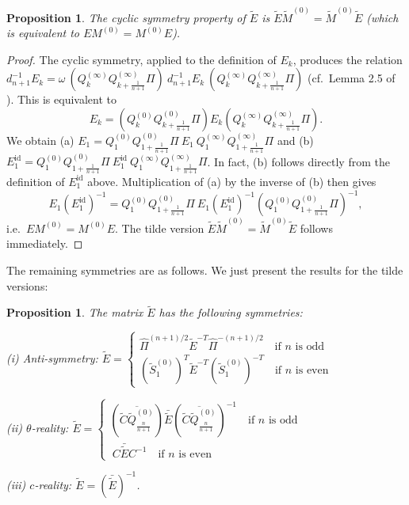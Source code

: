 \documentclass[a4paper,12pt,leqno]{amsart}
\numberwithin{equation}{section}
\theoremstyle{plain}
\newtheorem{proposition}[theorem]{Proposition}
\theoremstyle{definition}
\newcommand{\om}{\omega}
\DeclareMathOperator{\id}{id}
\newcommand{\Qz}{  Q^{(0)}  }
\newcommand{\Qi}{  Q^{(\infty)}  }
\newcommand{\Mz}{ M^{(0)}  }
\newcommand{\tSz}{  \tilde S^{(0)}  }
\newcommand{\tQz}{  \tilde Q^{(0)}  }
\newcommand{\tE}{  \tilde E  }
\newcommand{\tMz}{  \tilde M^{(0)}  }
\begin{document}
\begin{proposition}\label{Ecyclic} The cyclic symmetry property of $\tE$ is $\tE\tMz=\tMz \tE$
(which is equivalent to $E\Mz=\Mz E$).
\end{proposition}

\begin{proof} The cyclic symmetry, applied to the definition of $E_k$, produces the relation
$d_{n+1}^{-1} E_k= \om \ (\Qi_k \Qi_{k+\frac1{n+1}} \Pi)
\
d_{n+1}^{-1} E_k\  (\Qi_k \Qi_{k+\frac1{n+1}} \Pi)$
(cf.\ Lemma 2.5 of \cite{GIL2}).  This is equivalent to
\[
E_k = (\Qz_k \Qz_{k+\frac1{n+1}} \Pi) E_k (\Qi_k \Qi_{k+\frac1{n+1}} \Pi).
\]
We obtain
(a) $E_1 = \Qz_1\Qz_{1+\scriptstyle\frac1{n+1}}\Pi \  E_1\
\Qi_1\Qi_{1+\scriptstyle\frac1{n+1}}\Pi$
and
(b) $E_1^{\id} = \Qz_1\Qz_{1+\scriptstyle\frac1{n+1}}\Pi \  E_1^{\id}\
\Qi_1\Qi_{1+\scriptstyle\frac1{n+1}}\Pi$.
In fact, (b) follows directly from the definition of $E_1^{\id}$ above.
Multiplication of (a) by the inverse of (b) then gives
\[
E_1 (E_1^{\id})^{-1}=
 \Qz_1\Qz_{1+\scriptstyle\frac1{n+1}}\Pi \
 E_1 (E_1^{\id})^{-1}
(\Qz_1\Qz_{1+\scriptstyle\frac1{n+1}}\Pi)^{-1},
\]
i.e.\ $E \Mz=\Mz E$. The tilde version $\tE\tMz=\tMz \tE$ follows immediately.
\end{proof}

The remaining symmetries are as follows. We
just present the results for the tilde versions:

\begin{proposition}\label{fibresymmetries}
The matrix $\tilde E$ has the following symmetries:

\noindent (i) Anti-symmetry:
$
\tilde E=
\begin{cases}
\hat\Pi^{(n+1)/2}  \tilde E^{-T}  \hat\Pi^{-(n+1)/2} \quad\text{if $n$ is odd}
\\
(\tSz_1)^T  \tilde E^{-T}  (\tSz_1)^{-T}  \quad\text{if $n$ is even}
\end{cases}
$

\noindent (ii) $\theta$-reality:
$
\tilde E=
\begin{cases}

\left(
\overline{\tilde C\tQz_{ {\scriptstyle\frac{n}{n+1}}  } }
\right)
\bar {\tilde E}
\left(
\overline{\tilde C\tQz_{ {\scriptstyle\frac{n}{n+1}}  } }
\right)^{-1}
\quad\text{if $n$ is odd}
\\
\ C
\bar {\tilde E}
C^{-1}
\quad\text{if $n$ is even}
\end{cases}
$

\noindent (iii) $c$-reality:  $\tilde E = \left( \bar{\tilde E}\right)^{-1}$.
\newline
\end{proposition}
\end{document}
